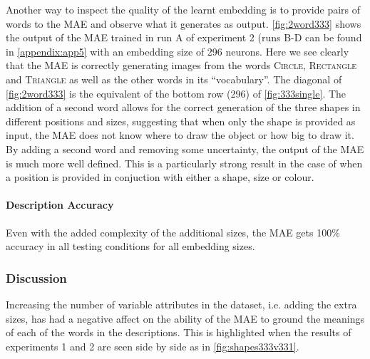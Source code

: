Another way to inspect the quality of the learnt embedding is to provide pairs of words to the \ac{MAE} and observe what it generates as output. \autoref{fig:2word333} shows the output of the \ac{MAE} trained in run A of experiment 2 (runs B-D can be found in \autoref{appendix:app5} with an embedding size of 296 neurons. Here we see clearly that the \ac{MAE} is correctly generating images from the words \textsc{Circle}, \textsc{Rectangle} and \textsc{Triangle} as well as the other words in its ``vocabulary''. The diagonal of \autoref{fig:2word333} is the equivalent of the bottom row (296) of \autoref{fig:333single}. The addition of a second word allows for the correct generation of the three shapes in different positions and sizes, suggesting that when only the shape is provided as input, the \ac{MAE} does not know where to draw the object or how big to draw it. By adding a second word and removing some uncertainty, the output of the \ac{MAE} is much more well defined. This is a particularly strong result in the case of when a position is provided in conjuction with either a shape, size or colour. 


\paragraph{Description Accuracy}
Even with the added complexity of the additional sizes, the MAE gets 100\% accuracy in all testing conditions for all embedding sizes. 


\subsubsection{Discussion}

Increasing the number of variable attributes in the dataset, i.e. adding the extra sizes, has had a negative affect on the ability of the \ac{MAE} to ground the meanings of each of the words in the descriptions. This is highlighted when the results of experiments 1 and 2 are seen side by side as in \autoref{fig:shapes333v331}.

